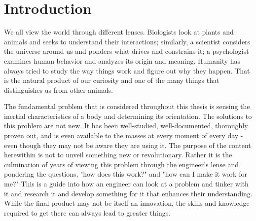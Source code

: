\chapter{Introduction}\label{chap:intro}
We all view the world through different lenses.
Biologists look at plants and animals and seeks to understand their interactions;
similarly, a scientist considers the universe around us and ponders what drives and constrains it;
a psychologist examines human behavior and analyzes its origin and meaning.
Humanity has always tried to study the way things work and figure out why they happen.
That is the natural product of our curiosity and one of the many things that distinguishes us from other animals.

The fundamental problem that is considered throughout this thesis is sensing the inertial characteristics of a body and determining its orientation.
The solutions to this problem are not new.
It has been well-studied, well-documented, thoroughly proven out, and is even available to the masses at every moment of every day - even though they may not be aware they are using it.
The purpose of the content herewithin is not to unveil something new or revolutionary.
Rather it is the culmination of years of viewing this problem through the engineer's lense and pondering the questions, "how does this work?" and "how can I make it work for me?"
This is a guide into how an engineer can look at a problem and tinker with it and research it and develop something for it that enhances their understanding.
While the final product may not be itself an innovation, the skills and knowledge required to get there can always lead to greater things.